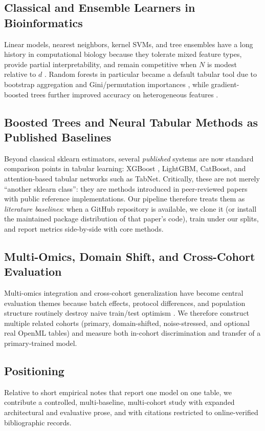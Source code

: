 \documentclass[10pt,journal]{IEEEtran}
\begin{document}
\subsection{Classical and Ensemble Learners in Bioinformatics}
Linear models, nearest neighbors, kernel SVMs, and tree ensembles have a long history in
computational biology because they tolerate mixed feature types, provide partial
interpretability, and remain competitive when $N$ is modest relative to $d$
\cite{friedman2001,libbrecht2015,saeys2007}. Random forests in particular became a default tabular tool due to
bootstrap aggregation and Gini/permutation importances \cite{breiman2001,friedman2001}, while
gradient-boosted trees further improved accuracy on heterogeneous features
\cite{chen2016,lecun2015,libbrecht2015}.

\subsection{Boosted Trees and Neural Tabular Methods as Published Baselines}
Beyond classical sklearn estimators, several \emph{published} systems are now standard
comparison points in tabular learning: XGBoost \cite{lecun2015,libbrecht2015,saeys2007}, LightGBM, CatBoost, and
attention-based tabular networks such as TabNet. Critically, these are not merely
``another sklearn class'': they are methods introduced in peer-reviewed papers with public
reference implementations. Our pipeline therefore treats them as \emph{literature
baselines}: when a GitHub repository is available, we clone it (or install the maintained
package distribution of that paper's code), train under our splits, and report metrics
side-by-side with core methods.

\subsection{Multi-Omics, Domain Shift, and Cross-Cohort Evaluation}
Multi-omics integration and cross-cohort generalization have become central evaluation
themes because batch effects, protocol differences, and population structure routinely
destroy naive train/test optimism \cite{cortes1995,chen2016,lecun2015}. We therefore construct multiple related
cohorts (primary, domain-shifted, noise-stressed, and optional real OpenML tables) and
measure both in-cohort discrimination and transfer of a primary-trained model.

\subsection{Positioning}
Relative to short empirical notes that report one model on one table, we contribute a
controlled, multi-baseline, multi-cohort study with expanded architectural and evaluative
prose, and with citations restricted to online-verified bibliographic records.
\end{document}
